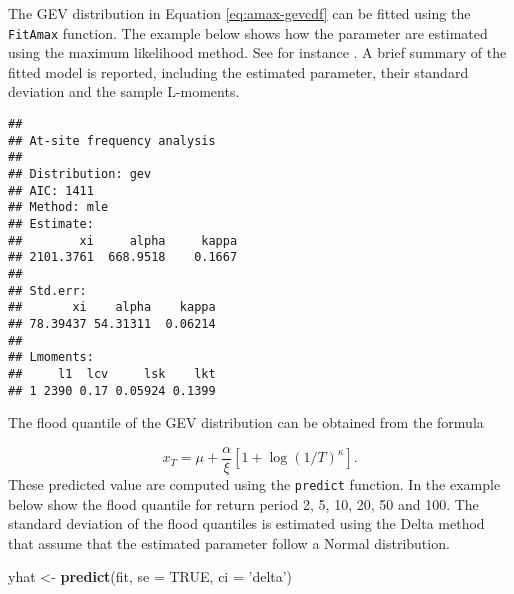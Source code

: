 \documentclass[]{book}
\newenvironment{Shaded}{\begin{snugshade}}{\end{snugshade}}
\newcommand{\DataTypeTok}[1]{\textcolor[rgb]{0.13,0.29,0.53}{#1}}
\newcommand{\KeywordTok}[1]{\textcolor[rgb]{0.13,0.29,0.53}{\textbf{#1}}}
\newcommand{\NormalTok}[1]{#1}
\newcommand{\OperatorTok}[1]{\textcolor[rgb]{0.81,0.36,0.00}{\textbf{#1}}}
\newcommand{\OtherTok}[1]{\textcolor[rgb]{0.56,0.35,0.01}{#1}}
\newcommand{\StringTok}[1]{\textcolor[rgb]{0.31,0.60,0.02}{#1}}
\theoremstyle{definition}
\theoremstyle{definition}
\theoremstyle{definition}
\theoremstyle{remark}
\begin{document}
The GEV distribution in Equation \eqref{eq:amax-gevcdf} can be fitted
using the \texttt{FitAmax} function. The example below shows how the
parameter are estimated using the maximum likelihood method. See for
instance \citep{coles_introduction_2001}. A brief summary of the fitted
model is reported, including the estimated parameter, their standard
deviation and the sample L-moments.

\begin{Shaded}
\end{Shaded}

\begin{verbatim}
## 
## At-site frequency analysis
## 
## Distribution: gev 
## AIC: 1411 
## Method: mle
## Estimate:
##        xi     alpha     kappa 
## 2101.3761  668.9518    0.1667 
## 
## Std.err:
##       xi    alpha    kappa 
## 78.39437 54.31311  0.06214 
## 
## Lmoments:
##     l1  lcv     lsk    lkt
## 1 2390 0.17 0.05924 0.1399
\end{verbatim}

The flood quantile of the GEV distribution can be obtained from the
formula

\[
x_T = \mu + \frac{\alpha}{\xi}\left[ 1+\log(1/T)^\kappa \right] .
\] These predicted value are computed using the \texttt{predict}
function. In the example below show the flood quantile for return period
2, 5, 10, 20, 50 and 100. The standard deviation of the flood quantiles
is estimated using the Delta method that assume that the estimated
parameter follow a Normal distribution.

\begin{Shaded}
\begin{Highlighting}[]
\NormalTok{yhat <-}\StringTok{ }\KeywordTok{predict}\NormalTok{(fit, }\DataTypeTok{se =} \OtherTok{TRUE}\NormalTok{, }\DataTypeTok{ci =} \StringTok{'delta'}\NormalTok{)}
\end{Highlighting}
\end{Shaded}
\end{document}
